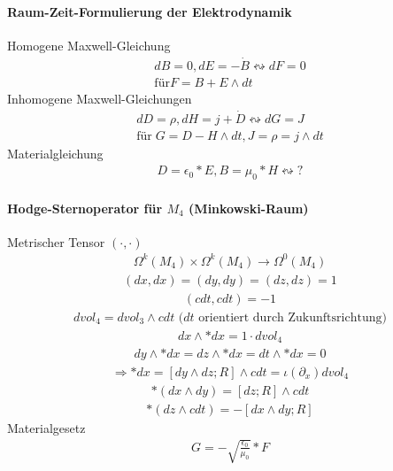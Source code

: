 \documentclass[10pt,a4paper]{article}
\begin{document}
\paragraph{Raum-Zeit-Formulierung der Elektrodynamik} $\,$ \\
Homogene Maxwell-Gleichung
\begin{align}
dB=0, dE= -\dot{B} \leftrightsquigarrow dF=0 \\ \text{für} F= B+E \wedge dt
\end{align}
Inhomogene Maxwell-Gleichungen
\begin{align}
dD= \rho , dH= j + \dot{D} \leftrightsquigarrow dG =J \\ \text{für} \; G= D-H \wedge dt , J= \rho =j \wedge dt
\end{align}
Materialgleichung
\begin{align}
D=\epsilon_0 * E, B= \mu_0 * H \leftrightsquigarrow ?
\end{align}
\paragraph{Hodge-Sternoperator für $M_4$ (Minkowski-Raum)} $\,$ \\
Metrischer Tensor $(\cdot , \cdot)$ 
\begin{align}
\Omega^k(M_4) \times \Omega^k(M_4) \longrightarrow \Omega^0 (M_4)
\end{align}
\begin{align}
(dx,dx)=(dy,dy)=(dz,dz)=1
\end{align}
\begin{align}
(cdt,cdt)=-1
\end{align}
\begin{align}
dvol_4= dvol_3 \wedge cdt \text{ ($dt$ orientiert durch Zukunftsrichtung)}
\end{align}
\begin{align}
dx \wedge *dx = 1 \cdot dvol_4
\end{align}
\begin{align}
dy \wedge * dx = dz \wedge *dx = dt \wedge *dx =0 
\end{align}
\begin{align}
\Rightarrow *dx = [dy \wedge dz ;R] \wedge cdt= \iota (\partial_x) dvol_4
\end{align}
\begin{align}
*(dx \wedge dy) = [dz;R] \wedge cdt
\end{align}
\begin{align}
*(dz \wedge cdt) =-[dx \wedge dy ; R]
\end{align}
Materialgesetz
\begin{align}
G= - \sqrt{\frac{\epsilon_0}{\mu_0}} * F
\end{align}
\end{document}
